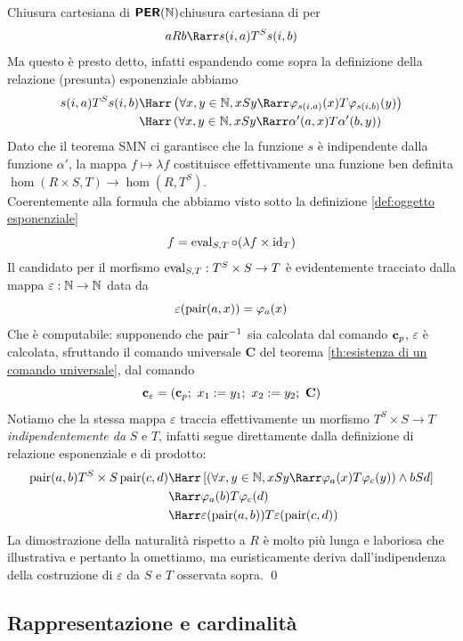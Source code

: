\documentclass[openany]{book}
\begin{document}
\begin{theorem}{Chiusura cartesiana di $\text{\sffamily\textbf{PER}}(\mathbb{N})$}{chiusura cartesiana di per}
    \[ aRb \Rarr s(i,a)T^S s(i,b) \]
    Ma questo è presto detto, infatti espandendo come sopra la definizione della relazione (presunta) esponenziale abbiamo 
    \begin{align*}
        s(i,a)T^S s(i,b) & \Harr \left(\forall x,y \in \N, xSy \Rarr \varphi_{s(i,a)}(x)  T  \varphi_{s(i,b)}(y)
        \right)\\
        & \Harr \left(\forall x,y \in \N, xSy \Rarr \alpha'(a,x) T \alpha'(b,y) \right)
    \end{align*}
    Dato che il teorema SMN ci garantisce che la funzione $s$ è indipendente dalla funzione $\alpha'$, la mappa $f\mapsto \lambda f$ costituisce effettivamente una funzione ben definita $\hom(R\times S, T)\to \hom(R,T^S)$.\\
    Coerentemente alla formula che abbiamo visto sotto la definizione \cref{def:oggetto esponenziale}
    \[ f = \operatorname{eval}_{S,T} \circ (\lambda f\times \operatorname{id}_T)\] 
    Il candidato per il morfismo $\operatorname{eval}_{S,T}:T^S\times S \to T$ è evidentemente tracciato dalla mappa $\varepsilon:\mathbb{N}\to\mathbb{N}$ data da 
    \[ \varepsilon(\operatorname{pair}(a,x)) = \varphi_a(x) \]
    Che è computabile: supponendo che $\operatorname{pair}^{-1}$ sia calcolata dal comando $\mathbf{c}_p$, $\varepsilon$ è calcolata, sfruttando il comando universale $\mathbf{C}$ del teorema \cref{th:esistenza di un comando universale}, dal comando
    \[ \mathbf{c}_\varepsilon = \left( \mathbf{c}_p;\ x_1:= y_1;\ x_2:= y_2;\ \mathbf{C}  \right) \]
    Notiamo che la stessa mappa $\varepsilon$ traccia effettivamente un morfismo $T^S\times S\to T$ \textit{indipendentemente da} $S$ e $T$, infatti segue direttamente dalla definizione di relazione esponenziale e di prodotto:
    \begin{align*}
       \pair(a,b) T^S\times S \pair(c,d) & \Harr \left[\left(\forall x, y \in \N, xSy\Rarr \varphi_a(x)T\varphi_c(y) \right)\wedge bSd \right] \\
       & \Rarr \varphi_a(b)T\varphi_c(d) \\
       & \Harr \varepsilon(\pair(a,b)) T \varepsilon(\pair(c,d))
    \end{align*}
    La dimostrazione della naturalità rispetto a $R$ è molto più lunga e laboriosa che illustrativa e pertanto la omettiamo, ma euristicamente deriva dall'indipendenza della costruzione di $\varepsilon$ da $S$ e $T$ osservata sopra.
    \qed
\end{theorem}

\subsection{Rappresentazione e cardinalità}
\end{document}
